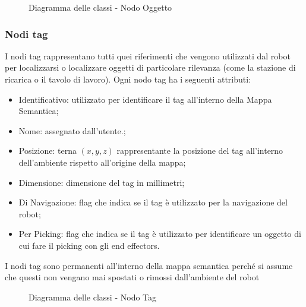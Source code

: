 \begin{figure}[h]
  \centering
  \caption{Diagramma delle classi - Nodo Oggetto}
\end{figure}

\subsubsection{Nodi tag}
I nodi tag rappresentano tutti quei riferimenti che vengono utilizzati dal robot per localizzarsi o localizzare oggetti di particolare rilevanza (come la stazione di ricarica o il tavolo di lavoro). Ogni nodo tag ha i seguenti attributi:
\begin{itemize}
  \item Identificativo: utilizzato per identificare il tag all'interno della Mappa Semantica;
  \item Nome: assegnato dall'utente.;
  \item Posizione: terna $(x, y, z)$ rappresentante la posizione del tag all'interno dell'ambiente rispetto all'origine della mappa;
  \item Dimensione: dimensione del tag in millimetri;
  \item Di Navigazione: flag che indica se il tag è utilizzato per la navigazione del robot;
  \item Per Picking: flag che indica se il tag è utilizzato per identificare un oggetto di cui fare il picking con gli end effectors.
\end{itemize}
I nodi tag sono permanenti all'interno della mappa semantica perché si assume che questi non vengano mai spostati o rimossi dall'ambiente del robot

\begin{figure}[h]
  \centering
  \caption{Diagramma delle classi - Nodo Tag}
\end{figure}

